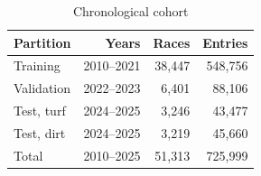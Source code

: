\begin{table}[!t]
\caption{Chronological cohort}
\label{tab:cohort}
\centering
\footnotesize
\renewcommand{\arraystretch}{1.12}
\begin{tabular*}{\columnwidth}{@{\extracolsep{\fill}}lrrr@{}}
\hline
Partition & Years & Races & Entries \\
\hline
Training & 2010--2021 & 38,447 & 548,756 \\
Validation & 2022--2023 & 6,401 & 88,106 \\
Test, turf & 2024--2025 & 3,246 & 43,477 \\
Test, dirt & 2024--2025 & 3,219 & 45,660 \\
\hline
Total & 2010--2025 & 51,313 & 725,999 \\
\hline
\end{tabular*}
\end{table}
